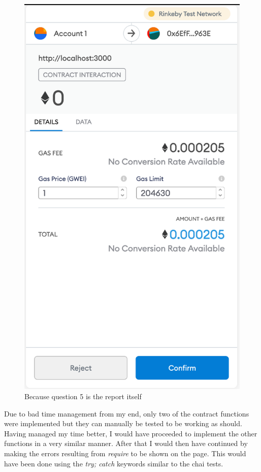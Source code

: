 \documentclass[a4paper, 12pt]{article}
\begin{document}
\begin{figure}[h!]
	\centering
	\includegraphics[width=\textwidth]{./Images/webConfirm}
	\caption{Because question 5 is the report itself}
	\label{fig:webConfirm}
\end{figure}

Due to bad time management from my end, only two of the contract functions were implemented but they can manually be tested to be working as should.
\\
Having managed my time better, I would have proceeded to implement the other functions in a very similar manner. After that I would then have continued by making the errors resulting from \textit{require} to be shown on the page. This would have been done using the \textit{try; catch} keywords similar to the chai tests.
\end{document}
